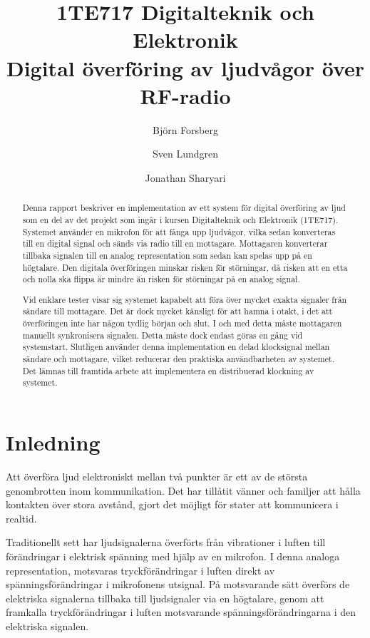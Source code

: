 \documentclass[a4paper,10pt]{article}
\title{1TE717 Digitalteknik och Elektronik \\ \textbf{Digital överföring av ljudvågor över RF-radio}}
\author{Bj{\"o}rn Forsberg \and Sven Lundgren \and Jonathan Sharyari}
\begin{document}
\maketitle

\begin{abstract}

Denna rapport beskriver en implementation av ett system för digital 
överföring av ljud som en del av det projekt som ingår i kursen Digitalteknik 
och Elektronik (1TE717). Systemet använder en mikrofon för att fånga upp 
ljudvågor, vilka sedan konverteras till en digital signal och sänds via radio 
till en mottagare. Mottagaren konverterar tillbaka signalen till en analog 
representation som sedan kan spelas upp på en högtalare. Den digitala 
överföringen minskar risken för störningar, då risken att en etta och nolla ska 
flippa är mindre än risken för störningar på en analog signal.

Vid enklare tester visar sig systemet kapabelt att föra över mycket exakta 
signaler från sändare till mottagare. Det är dock mycket känsligt för att hamna
i otakt, i det att överföringen inte har någon tydlig början och slut. I och med
detta måste mottagaren manuellt synkronisera signalen. Detta måste dock endast
göras en gång vid systemstart. Slutligen använder denna implementation en delad
klocksignal mellan sändare och mottagare, vilket reducerar den praktiska 
användbarheten av systemet. Det lämnas till framtida arbete att implementera en
distribuerad klockning av systemet.
\end{abstract}

\section{Inledning}

Att överföra ljud elektroniskt mellan två punkter är ett av de största 
genombrotten inom kommunikation. Det har tillåtit vänner och familjer  att hålla 
kontakten över stora avstånd, gjort det möjligt för stater att kommunicera i 
realtid.

Traditionellt sett har ljudsignalerna överförts från vibrationer i luften till
förändringar i elektrisk spänning med hjälp av en mikrofon. I denna analoga 
representation, motsvaras tryckförändringar i luften direkt av 
spänningsförändringar i mikrofonens utsignal. På motsvarande sätt överförs de
elektriska signalerna tillbaka till ljudsignaler via en högtalare, genom att 
framkalla tryckförändringar i luften motsvarande spänningsförändringarna i
den elektriska signalen.
\end{document}
